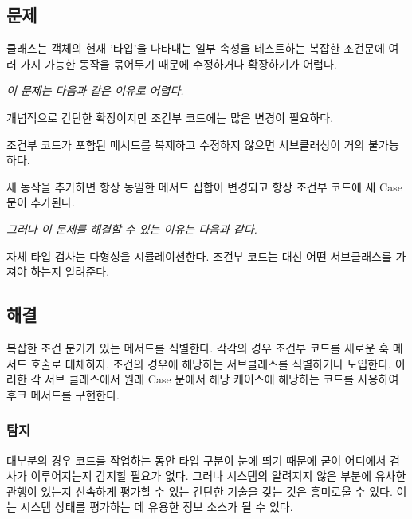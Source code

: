 \documentclass[a4paper,10pt,twoside]{book}
\begin{document}

\subsection*{문제}

클래스는 객체의 현재 '타입'을 나타내는 일부 속성을 테스트하는 복잡한 조건문에 여러 가지 가능한 동작을 묶어두기 때문에 수정하거나 확장하기가 어렵다.

\emph{이 문제는 다음과 같은 이유로 어렵다.}

\begin{bulletlist}
\item 개념적으로 간단한 확장이지만 조건부 코드에는 많은 변경이 필요하다.

\item 조건부 코드가 포함된 메서드를 복제하고 수정하지 않으면 서브클래싱이 거의 불가능하다.

\item 새 동작을 추가하면 항상 동일한 메서드 집합이 변경되고 항상 조건부 코드에 새 Case 문이 추가된다.
\end{bulletlist}

\emph{그러나 이 문제를 해결할 수 있는 이유는 다음과 같다.}

\begin{bulletlist}
\item 자체 타입 검사는 다형성을 시뮬레이션한다. 조건부 코드는 대신 어떤 서브클래스를 가져야 하는지 알려준다.
\end{bulletlist}

\subsection*{해결}

복잡한 조건 분기가 있는 메서드를 식별한다. 각각의 경우 조건부 코드를 새로운 훅 메서드 호출로 대체하자. 조건의 경우에 해당하는 서브클래스를 식별하거나 도입한다. 이러한 각 서브 클래스에서 원래 Case 문에서 해당 케이스에 해당하는 코드를 사용하여 후크 메서드를 구현한다.

\subsubsection*{탐지}

대부분의 경우 코드를 작업하는 동안 타입 구분이 눈에 띄기 때문에 굳이 어디에서 검사가 이루어지는지 감지할 필요가 없다. 그러나 시스템의 알려지지 않은 부분에 유사한 관행이 있는지 신속하게 평가할 수 있는 간단한 기술을 갖는 것은 흥미로울 수 있다. 이는 시스템 상태를 평가하는 데 유용한 정보 소스가 될 수 있다.
\end{document}
